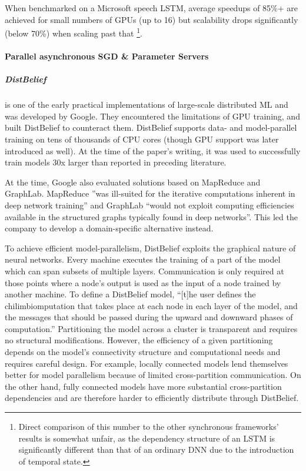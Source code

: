 When benchmarked on a Microsoft speech LSTM, average speedups of 85\%+ are achieved for small numbers of GPUs (up to 16) but scalability drops significantly (below 70\%) when scaling past that \footnote{Direct comparison of this number to the other synchronous frameworks' results is somewhat unfair, as the dependency structure of an LSTM is significantly different than that of an ordinary DNN due to the introduction of temporal state.}.


\paragraph{Parallel asynchronous SGD \& Parameter Servers}

\subparagraph{DistBelief \citep{DistBelief2012}}
is one of the early practical implementations of large-scale distributed ML and was developed by Google. They encountered the limitations of GPU training, and built DistBelief to counteract them. DistBelief supports data- and model-parallel training on tens of thousands of CPU cores (though GPU support was later introduced as well\citep{Tensorflow2016}). At the time of the paper's writing, it was used to successfully train models 30x larger than reported in preceding literature.

At the time, Google also evaluated solutions based on MapReduce\citep{MapReduce} and GraphLab\citep{GraphLab}. MapReduce ”was ill-suited for the iterative computations inherent in deep network training” and GraphLab “would not exploit computing efficiencies available in the structured graphs typically found in deep networks”. This led the company to develop a domain-specific alternative instead.

To achieve efficient model-parallelism, DistBelief exploits the graphical nature of neural networks. Every machine executes the training of a part of the model which can span subsets of multiple layers. Communication is only required at those points where a node’s output is used as the input of a node trained by another machine. To define a DistBelief model, “[t]he user defines the chilimbiomputation that takes place at each node in each layer of the model, and the messages that should be passed during the upward and downward phases of computation.” Partitioning the model across a cluster is transparent and requires no structural modifications. However, the efficiency of a given partitioning depends on the model’s connectivity structure and computational needs and requires careful design. For example, locally connected models lend themselves better for model parallelism because of limited cross-partition communication. On the other hand, fully connected models have more substantial cross-partition dependencies and are therefore harder to efficiently distribute through DistBelief.

